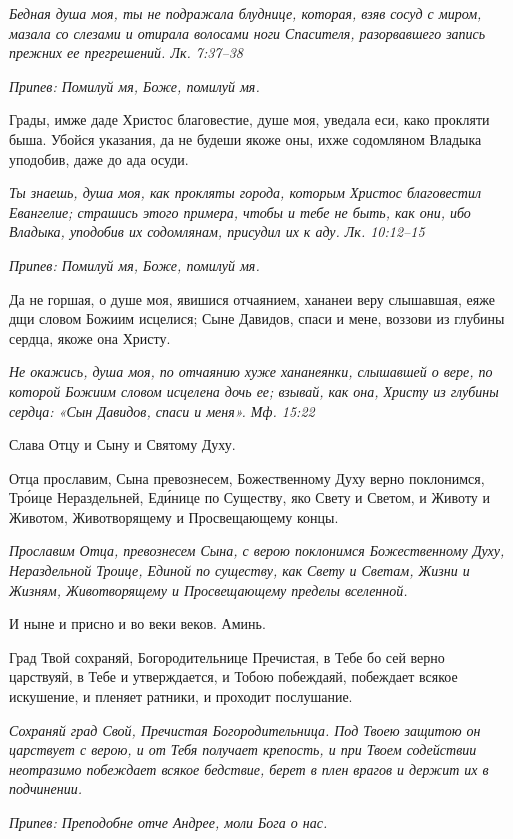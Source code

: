 \itshape Бедная душа моя, ты не подражала блуднице, которая, взяв сосуд с миром, мазала со слезами и отирала волосами ноги Спасителя, разорвавшего запись прежних ее прегрешений. Лк. 7:37–38\normalfont{}


\itshape Припев:\normalfont{} Помилуй мя, Боже, помилуй мя.


Грады, имже даде Христос благовестие, душе моя, уведала еси, како прокляти быша. Убойся указания, да не будеши якоже оны, ихже содомляном Владыка уподобив, даже до ада осуди.


\itshape Ты знаешь, душа моя, как прокляты города, которым Христос благовестил Евангелие; страшись этого примера, чтобы и тебе не быть, как они, ибо Владыка, уподобив их содомлянам, присудил их к аду. Лк. 10:12–15\normalfont{}


\itshape Припев:\normalfont{} Помилуй мя, Боже, помилуй мя.


Да не горшая, о душе моя, явишися отчаянием, хананеи веру слышавшая, еяже дщи словом Божиим исцелися; Сыне Давидов, спаси и мене, воззови из глубины сердца, якоже она Христу.


\itshape Не окажись, душа моя, по отчаянию хуже хананеянки, слышавшей о вере, по которой Божиим словом исцелена дочь ее; взывай, как она, Христу из глубины сердца: «Сын Давидов, спаси и меня». Мф. 15:22\normalfont{}


Слава Отцу и Сыну и Святому Духу.


Отца прославим, Сына превознесем, Божественному Духу верно поклонимся, Тро́ице Нераздельней, Еди́нице по Существу, яко Свету и Светом, и Животу и Животом, Животворящему и Просвещающему концы.


\itshape Прославим Отца, превознесем Сына, с верою поклонимся Божественному Духу, Нераздельной Троице, Единой по существу, как Свету и Светам, Жизни и Жизням, Животворящему и Просвещающему пределы вселенной.\normalfont{}


И ныне и присно и во веки веков. Аминь.


Град Твой сохраняй, Богородительнице Пречистая, в Тебе бо сей верно царствуяй, в Тебе и утверждается, и Тобою побеждаяй, побеждает всякое искушение, и пленяет ратники, и проходит послушание.


\itshape Сохраняй град Свой, Пречистая Богородительница. Под Твоею защитою он царствует с верою, и от Тебя получает крепость, и при Твоем содействии неотразимо побеждает всякое бедствие, берет в плен врагов и держит их в подчинении.\normalfont{}


\itshape Припев:\normalfont{} Преподобне отче Андрее, моли Бога о нас.


